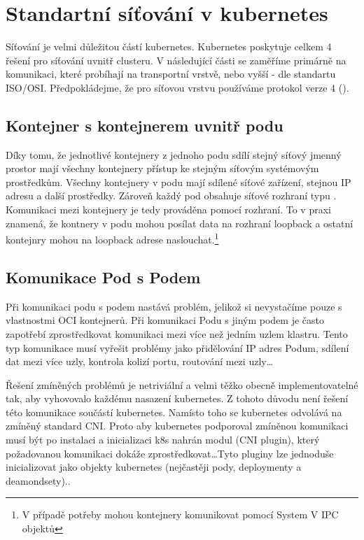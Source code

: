 \section{Standartní síťování v kubernetes}
Síťování je velmi důležitou částí kubernetes. Kubernetes poskytuje celkem 4 řešení pro síťování uvnitř clusteru. V následující části se zaměříme primárně na komunikaci, které probíhají na transportní vrstvě, nebo vyšší - dle standartu ISO/OSI. Předpokládejme, že pro síťovou vrstvu používáme protokol  verze 4 ().

\subsection{Kontejner s kontejnerem uvnitř podu}
Díky tomu, že jednotlivé kontejnery z jednoho podu sdílí stejný síťový jmenný prostor mají všechny kontejnery přístup ke stejným síťovým systémovým prostředkům. Všechny kontejnery v podu mají sdílené síťové zařízení, stejnou IP adresu a další prostředky. Zároveň každý pod obsahuje síťové rozhraní typu . Komunikaci mezi kontejnery je tedy prováděna pomocí  rozhraní. To v praxi znamená, že kontnery v podu mohou posílat data na rozhraní loopback a ostatní kontejnry mohou na loopback adrese naslouchat.\footnote{V případě potřeby mohou kontejnery komunikovat pomocí System V IPC objektů}

\subsection{Komunikace Pod s Podem}
Při komunikaci podu s podem nastává problém, jelikož si nevystačíme pouze s vlastnostmi OCI kontejnerů. Při komunikaci Podu s jiným podem je často zapotřebí zprostředkovat komunikaci mezi více než jedním uzlem klastru.
Tento typ komunikace musí vyřešit problémy jako přidělování IP adres Podum, sdílení dat mezi více uzly, kontrola kolizí portu, routování mezi uzly\ldots

Řešení zmíněných problémů je netriviální a velmi těžko obecně implementovatelné tak, aby vyhovovalo každému nasazení kubernetes. Z tohoto důvodu není řešení této komunikace součástí kubernetes. Namísto toho se kubernetes odvolává na zmíněný standard CNI. Proto aby kubernetes podporoval zmíněnou komunikaci musí být po instalaci a inicializaci k8s nahrán modul (CNI plugin), který požadovanou komunikaci dokáže zprostředkovat\ldots{Tyto pluginy lze jednoduše inicializovat jako objekty kubernetes (nejčastěji pody, deploymenty a deamondsety).}.

